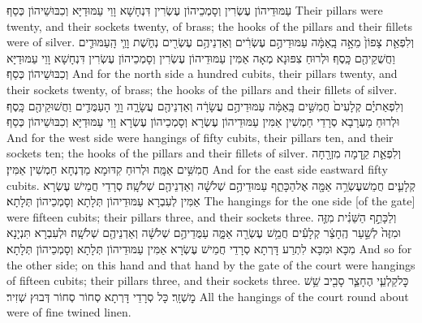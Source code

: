 {עַמּוּדֵיהוֹן עֶשְׂרִין וְסָמְכֵיהוֹן עֶשְׂרִין דִּנְחָשָׁא וָוֵי עַמּוּדַיָּא וְכִבּוּשֵׁיהוֹן כְּסַף׃}
{Their pillars were twenty, and their sockets twenty, of brass; the hooks of the pillars and their fillets were of silver.}{}
{וְלִפְאַ֤ת צָפוֹן֙ מֵאָ֣ה בָֽאַמָּ֔ה עַמּוּדֵיהֶ֣ם עֶשְׂרִ֔ים וְאַדְנֵיהֶ֥ם עֶשְׂרִ֖ים נְחֹ֑שֶׁת וָוֵ֧י הָֽעַמּוּדִ֛ים וַחֲשֻׁקֵיהֶ֖ם כָּֽסֶף׃}
{וּלְרוּחַ צִפּוּנָא מְאָה אַמִּין עַמּוּדֵיהוֹן עֶשְׂרִין וְסָמְכֵיהוֹן עֶשְׂרִין דִּנְחָשָׁא וָוֵי עַמּוּדַיָּא וְכִבּוּשֵׁיהוֹן כְּסַף׃}
{And for the north side a hundred cubits, their pillars twenty, and their sockets twenty, of brass; the hooks of the pillars and their fillets of silver.}{}
{וְלִפְאַת\maqqaf יָ֗ם קְלָעִים֙ חֲמִשִּׁ֣ים בָּֽאַמָּ֔ה עַמּוּדֵיהֶ֣ם עֲשָׂרָ֔ה וְאַדְנֵיהֶ֖ם עֲשָׂרָ֑ה וָוֵ֧י הָעַמֻּדִ֛ים וַחֲשׁוּקֵיהֶ֖ם כָּֽסֶף׃}
{וּלְרוּחַ מַעְרָבָא סְרָדֵי חַמְשִׁין אַמִּין עַמּוּדֵיהוֹן עֶשְׂרָא וְסָמְכֵיהוֹן עֶשְׂרָא וָוֵי עַמּוּדַיָּא וְכִבּוּשֵׁיהוֹן כְּסַף׃}
{And for the west side were hangings of fifty cubits, their pillars ten, and their sockets ten; the hooks of the pillars and their fillets of silver.}{}
{וְלִפְאַ֛ת קֵ֥דְמָה מִזְרָ֖חָה חֲמִשִּׁ֥ים אַמָּֽה׃}
{וּלְרוּחַ קִדּוּמָא מַדְנְחָא חַמְשִׁין אַמִּין׃}
{And for the east side eastward fifty cubits.}{}
{קְלָעִ֛ים חֲמֵשׁ\maqqaf עֶשְׂרֵ֥ה אַמָּ֖ה אֶל\maqqaf הַכָּתֵ֑ף עַמּוּדֵיהֶ֣ם שְׁלֹשָׁ֔ה וְאַדְנֵיהֶ֖ם שְׁלֹשָֽׁה׃}
{סְרָדֵי חֲמֵישׁ עֶשְׂרָא אַמִּין לְעִבְרָא עַמּוּדֵיהוֹן תְּלָתָא וְסָמְכֵיהוֹן תְּלָתָא׃}
{The hangings for the one side [of the gate] were fifteen cubits; their pillars three, and their sockets three.}{}
{וְלַכָּתֵ֣ף הַשֵּׁנִ֗ית מִזֶּ֤ה וּמִזֶּה֙ לְשַׁ֣עַר הֶֽחָצֵ֔ר קְלָעִ֕ים חֲמֵ֥שׁ עֶשְׂרֵ֖ה אַמָּ֑ה עַמֻּדֵיהֶ֣ם שְׁלֹשָׁ֔ה וְאַדְנֵיהֶ֖ם שְׁלֹשָֽׁה׃}
{וּלְעִבְרָא תִּנְיָנָא מִכָּא וּמִכָּא לִתְרַע דָּרְתָא סְרָדֵי חֲמֵישׁ עֶשְׂרָא אַמִּין עַמּוּדֵיהוֹן תְּלָתָא וְסָמְכֵיהוֹן תְּלָתָא׃}
{And so for the other side; on this hand and that hand by the gate of the court were hangings of fifteen cubits; their pillars three, and their sockets three.}{}
{כׇּל\maqqaf קַלְעֵ֧י הֶחָצֵ֛ר סָבִ֖יב שֵׁ֥שׁ מׇשְׁזָֽר׃}
{כָּל סְרָדֵי דָּרְתָא סְחוֹר סְחוֹר דְּבוּץ שְׁזִיר׃}
{All the hangings of the court round about were of fine twined linen.}{}
